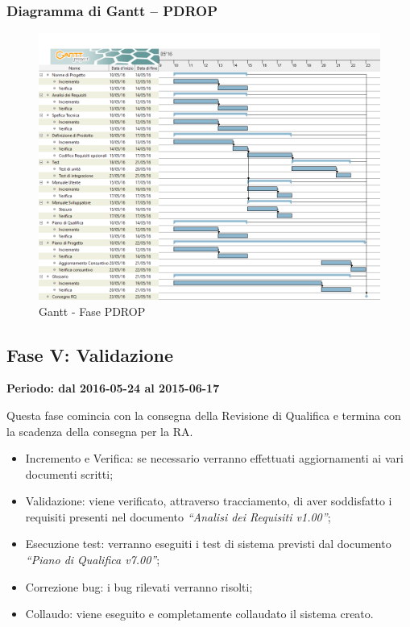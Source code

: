 \documentclass[../PianoProgetto.tex]{subfiles}
\begin{document}
		\subsubsection{Diagramma di Gantt – PDROP}
			\begin{figure}[!h]
				\centering
				\includegraphics[width=\textwidth]{gantt_png/6-requisiti_facoltativi}
				\caption{Gantt - Fase PDROP}
				\label{fig:Gantt - Fase PDROP}
			\end{figure}
			

	\subsection{Fase V: Validazione}
		\textbf{Periodo: dal 2016-05-24 al 2015-06-17}
		
		Questa fase comincia con la consegna della Revisione di Qualifica e termina con la scadenza della consegna per la RA.

		\begin{itemize}
				\item Incremento e Verifica: se necessario verranno effettuati aggiornamenti ai vari documenti scritti;

				\item Validazione: viene verificato, attraverso tracciamento, di aver soddisfatto i requisiti presenti nel documento \textit{“Analisi dei Requisiti v1.00”};

				\item Esecuzione test: verranno eseguiti i test di sistema previsti dal documento \textit{“Piano di Qualifica v7.00”};

				\item Correzione bug: i bug rilevati verranno risolti;

				\item Collaudo: viene eseguito e completamente collaudato il sistema creato.
		\end{itemize}
		
\end{document}
